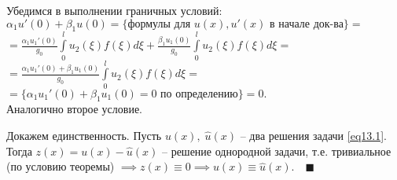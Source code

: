 Убедимся в выполнении граничных условий:\\ 

$\alpha_1 u'(0) + \beta_1 u(0) = \{ \text{формулы для $u(x), u'(x)$ в начале док-ва} \} =$\\$= \frac{\alpha_1 u_1'(0)}{g_0} \int\limits_0^l u_2(\xi) f(\xi) d\xi + \frac{\beta_1 u_1(0)}{g_0} \int\limits_0^l u_2(\xi) f(\xi) d\xi =$\\$= \frac{\alpha_1 u_1'(0) + \beta_1 u_1(0)}{g_0} \int\limits_0^l u_2(\xi) f(\xi) d\xi =$\\$= \{ \alpha_1 u_1'(0) + \beta_1 u_1(0) =  0 \text{ по определению} \} = 0.$ \\

Аналогично второе условие.

Докажем единственность. Пусть $u(x),\; \widehat{u}(x)$ -- два решения задачи \eqref{eq13.1}. Тогда $z(x) = u(x) - \widehat{u}(x)$ -- решение однородной задачи, т.е. тривиальное (по условию теоремы) $\implies z(x) \equiv 0 \implies u(x) \equiv \widehat{u}(x). \quad \blacksquare$

